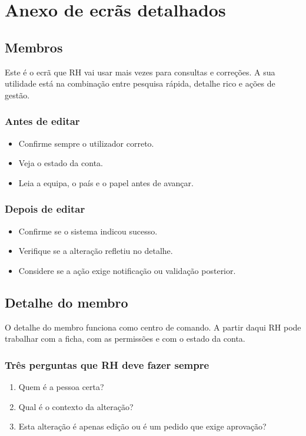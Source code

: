 \chapter{Anexo de ecrãs detalhados}
\section{Membros}
Este é o ecrã que RH vai usar mais vezes para consultas e correções. A sua utilidade está na combinação entre pesquisa rápida, detalhe rico e ações de gestão.

\subsection{Antes de editar}
\begin{itemize}
  \item Confirme sempre o utilizador correto.
  \item Veja o estado da conta.
  \item Leia a equipa, o país e o papel antes de avançar.
\end{itemize}

\subsection{Depois de editar}
\begin{itemize}
  \item Confirme se o sistema indicou sucesso.
  \item Verifique se a alteração refletiu no detalhe.
  \item Considere se a ação exige notificação ou validação posterior.
\end{itemize}

\section{Detalhe do membro}
O detalhe do membro funciona como centro de comando. A partir daqui RH pode trabalhar com a ficha, com as permissões e com o estado da conta.

\subsection{Três perguntas que RH deve fazer sempre}
\begin{enumerate}
  \item Quem é a pessoa certa?
  \item Qual é o contexto da alteração?
  \item Esta alteração é apenas edição ou é um pedido que exige aprovação?
\end{enumerate}

